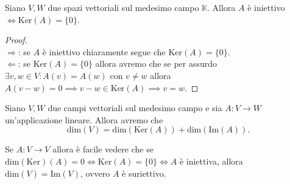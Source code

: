 \documentclass[12pt, twoside, italian, openany]{book}
\begin{document}
	\begin{prop}
		Siano $V, W$ due spazi vettoriali sul medesimo campo $\mathbb{K}$. Allora $A$ è iniettivo $\iff \text{Ker}(A) = \{ 0 \}$.
	\end{prop}
	\begin{proof} \hspace{1cm} \\
		$\boxed{\Rightarrow}$: se $A$ è iniettivo chiaramente segue che $\text{Ker}(A) = \{ 0 \}$. \\
		$\boxed{\Leftarrow}$: se $\text{Ker}(A) = \{ 0 \}$ allora avremo che se per assurdo $\exists v, w \in V : A(v) = A(w)$ con $v \neq w$ allora $A(v - w) = 0 \implies v - w \in \text{Ker}(A) \implies v = w$.
	\end{proof}
	\begin{theorem}
		Siano $V, W$ due campi vettoriali sul medesimo campo e sia $A: V \to W$ un'applicazione lineare. Allora avremo che
		$$
		\text{dim}(V) = \text{dim}(\text{Ker}(A)) + \text{dim}(\text{Im}(A)).
		$$
	\end{theorem}
	\begin{remark}
		Se $A: V \to V$ allora è facile vedere che se $\text{dim}(\text{Ker})(A) = 0 \iff \text{Ker}(A) = \{ 0 \} \iff A$ è iniettiva, allora $\text{dim}(V) = \text{Im}(V)$, ovvero $A$ è suriettivo.
	\end{remark}
\end{document}
